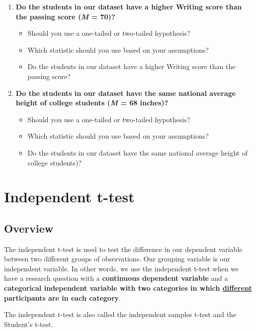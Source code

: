 \documentclass[
]{book}
\begin{document}
\begin{enumerate}
\def\labelenumi{\arabic{enumi}.}
\item
  \textbf{Do the students in our dataset have a higher Writing score than the passing score (\emph{M} = 70)?}

  \begin{itemize}
  \item
    Should you use a one-tailed or two-tailed hypothesis?
  \item
    Which statistic should you use based on your assumptions?
  \item
    Do the students in our dataset have a higher Writing score than the passing score?
  \end{itemize}
\item
  \textbf{Do the students in our dataset have the same national average height of college students (\emph{M} = 68 inches)?}

  \begin{itemize}
  \item
    Should you use a one-tailed or two-tailed hypothesis?
  \item
    Which statistic should you use based on your assumptions?
  \item
    Do the students in our dataset have the same national average height of college students)?
  \end{itemize}
\end{enumerate}

\hypertarget{independent-t-test}{%
\section{Independent t-test}\label{independent-t-test}}

\hypertarget{overview-1}{%
\subsection{Overview}\label{overview-1}}

The independent t-test is used to test the difference in our dependent variable between two different groups of observations. Our grouping variable is our independent variable. In other words, we use the independent t-test when we have a research question with a \textbf{continuous dependent variable} and a \textbf{categorical independent variable with two categories in which \underline{different} participants are in each category}.

The independent t-test is also called the independent samples t-test and the Student's t-test.
\end{document}
